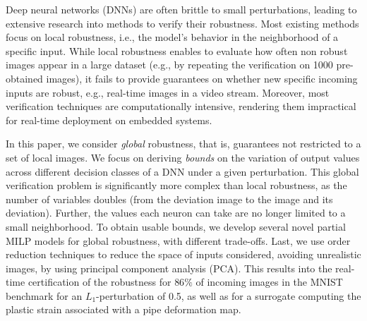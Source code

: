 Deep neural networks (DNNs) are often brittle to small perturbations, leading to extensive research into methods to verify their robustness. Most existing methods focus on local robustness, i.e., the model's behavior in the neighborhood of a specific input. While local robustness enables to evaluate how often non robust images appear in a large dataset (e.g., by repeating the verification on 1000 pre-obtained images), it fails to provide guarantees on whether new specific incoming inputs are robust, e.g., real-time images in a video stream. Moreover, most verification techniques are computationally intensive, rendering them impractical for real-time deployment on embedded systems. 

In this paper, we consider {\em global} robustness, that is, guarantees not restricted to a set of local images. We focus on deriving {\em bounds} on the variation of output values across different decision classes of a DNN under a given perturbation. This global verification problem is significantly more complex than local robustness, as the number of variables doubles (from the deviation image to the image and its deviation). Further, the values each neuron can take are no longer limited to a small neighborhood. To obtain usable bounds, we develop several novel partial MILP models for global robustness, with different trade-offs. Last, we use order reduction techniques to reduce the space of inputs considered, avoiding unrealistic images, by using principal component analysis (PCA). This results into the real-time  certification of the robustness for $86\%$ of incoming images in the MNIST benchmark for an $L_1$-perturbation of 0.5, as well as for a surrogate computing the
plastic strain associated with a pipe deformation map.